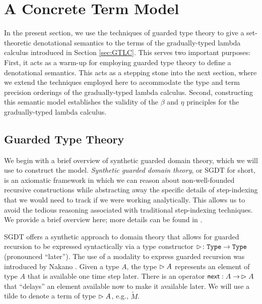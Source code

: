 \section{A Concrete Term Model}\label{sec:concrete-term-model}

%
In the present section, we use the techniques of guarded type theory to give a
set-theoretic denotational semantics to the terms of the gradually-typed lambda
calculus introduced in Section \ref{sec:GTLC}. This serves two important
purposes: First, it acts as a warm-up for employing guarded type theory to
define a denotational semantics. This acts as a stepping stone into the next
section, where we extend the techniques employed here to accommodate the type
and term precision orderings of the gradually-typed lambda calculus. Second,
constructing this semantic model establishes the validity of the $\beta$ and
$\eta$ principles for the gradually-typed lambda calculus. 
%
%

\subsection{Guarded Type Theory}

We begin with a brief overview of synthetic guarded domain theory, which we will
use to construct the model. \emph{Synthetic guarded domain theory}, or SGDT for
short, is an axiomatic framework in which we can reason about non-well-founded
recursive constructions while abstracting away the specific details of
step-indexing that we would need to track if we were working analytically. This
allows us to avoid the tedious reasoning associated with traditional
step-indexing techniques. We provide a brief overview here; more details can be
found in \cite{birkedal-mogelberg-schwinghammer-stovring2011}.

SGDT offers a synthetic approach to domain theory that allows for guarded
recursion to be expressed syntactically via a type constructor $\vartriangleright \colon
\texttt{Type} \to \texttt{Type}$ (pronounced ``later''). The use of a modality to express
guarded recursion was introduced by Nakano \cite{Nakano2000}.
%
Given a type $A$, the type $\vartriangleright A$ represents an element of type $A$ that is
available one time step later. There is an operator $\mathsf{next} : A \to\, \vartriangleright A$
that ``delays'' an element available now to make it available later. We will use
a tilde to denote a term of type $\vartriangleright A$, e.g., $\tilde{M}$.

